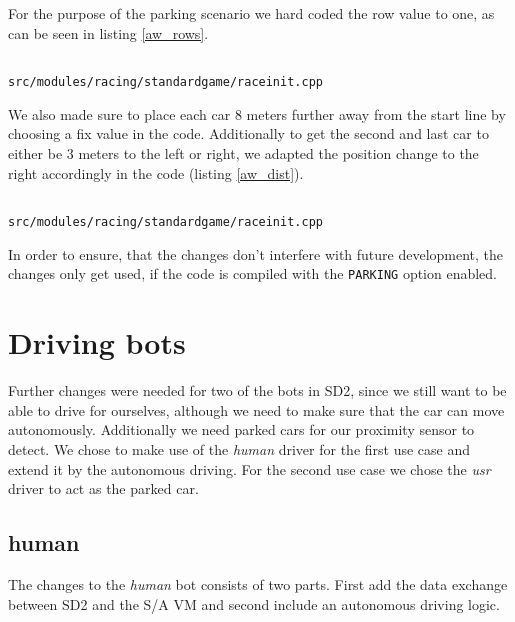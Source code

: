 \documentclass[paper=a4, fontsize=11pt]{scrreprt}
\begin{document}
For the purpose of the parking scenario we hard coded the row value to one,
as can be seen in listing \ref{aw_rows}.
\begin{listing}[ht]
  \inputminted[firstline=309,linenos=true,lastline=311,gobble=1]{c++}{../../../simulators/speed-dreams/src/modules/racing/standardgame/raceinit.cpp}
  \caption{\texttt{src/modules/racing/standardgame/raceinit.cpp}}\label{aw_rows}
\end{listing}

We also made sure to place each car 8 meters further away from the start line by choosing a fix value in the code.
Additionally to get the second and last car to either be 3 meters to the left or right,
we adapted the position change to the right accordingly in the code (listing \ref{aw_dist}).
\begin{listing}[ht]
  \inputminted[firstline=316,linenos=true,lastline=327,gobble=4]{c++}{../../../simulators/speed-dreams/src/modules/racing/standardgame/raceinit.cpp}
  \caption{\texttt{src/modules/racing/standardgame/raceinit.cpp}}\label{aw_dist}
\end{listing}

In order to ensure, that the changes don't interfere with future development,
the changes only get used, if the code is compiled with the \texttt{PARKING} option enabled.

\section{Driving bots}
Further changes were needed for two of the bots in SD2,
since we still want to be able to drive for ourselves,
although we need to make sure that the car can move autonomously.
Additionally we need parked cars for our proximity sensor to detect.
We chose to make use of the \textit{human} driver for the first use case
and extend it by the autonomous driving.
For the second use case we chose the \textit{usr} driver to act as the parked car.

\subsection{human}
The changes to the \textit{human} bot consists of two parts.
First add the data exchange between SD2 and the S/A VM
and second include an autonomous driving logic.
\end{document}
